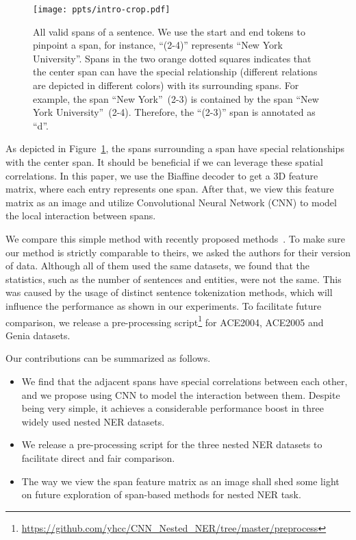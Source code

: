 \documentclass[11pt]{article}
\begin{document}
\begin{figure}[!t]
  \centering
  \texttt{[image: ppts/intro-crop.pdf]}
  \caption{All valid spans of a sentence. We use the start and end tokens to pinpoint a span, for instance, ``(2-4)'' represents ``New York University''. Spans in the two orange dotted squares indicates that the center span can have the special relationship (different relations are depicted in different colors) with its surrounding spans. For example, the span ``New York''~(2-3) is contained by the span ``New York University''~(2-4).  Therefore, the ``(2-3)'' span is annotated as ``d''.} \label{fig:example}
\end{figure}

As depicted in Figure~\ref{fig:example}, the spans surrounding a span have special relationships with the center span. It should be beneficial if we can leverage these spatial correlations. In this paper, we use the Biaffine decoder \cite{DBLP:conf/iclr/DozatM17} to get a 3D feature matrix, where each entry represents one span. After that, we view this feature matrix as an image and utilize Convolutional Neural Network (CNN) to model the local interaction between spans. 


We compare this simple method with recently proposed methods~\cite{DBLP:conf/acl/WanR0022,DBLP:conf/aaai/Li00WZTJL22,DBLP:conf/acl/Zhu022,DBLP:conf/acl/0002THH22}. To make sure our method is strictly comparable to theirs, we asked the authors for their version of data. Although all of them used the same datasets, we found that the statistics, such as the number of sentences and entities, were not the same. This was caused by the usage of distinct sentence tokenization methods, which will influence the performance as shown in our experiments.
To facilitate future comparison, we release a pre-processing script\footnote{\url{https://github.com/yhcc/CNN_Nested_NER/tree/master/preprocess}} for ACE2004, ACE2005 and Genia datasets. 

Our contributions can be summarized as follows.
\begin{itemize}
  \item We find that the adjacent spans have special correlations between each other, and we propose using CNN to model the interaction between them. Despite being very simple, it achieves a considerable performance boost in three widely used nested NER datasets.
  \item We release a pre-processing script for the three nested NER datasets to facilitate direct and fair comparison. 
  \item The way we view the span feature matrix as an image shall shed some light on future exploration of span-based methods for nested NER task.
\end{itemize}
\end{document}
